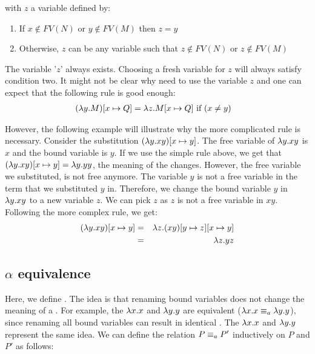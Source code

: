   


with $z$ a variable defined by:
\begin{enumerate}
	\item%
	If $x \notin FV(N)$ or $y \notin FV(M)$ then $z = y$
	\item%
	Otherwise, $z$ can be any variable such that $z \notin FV(N)$ or $z \notin FV(M)$
\end{enumerate}

The variable '$z$' always exists. Choosing a fresh variable for $z$ will always satisfy condition two.
It might not be clear why need to use the variable $z$ and one can expect that the following rule is good enough:
\begin{align*}
	(\lambda {y}.{M}) [{x}\mapsto{Q}] &= \lambda {z}.{M [{x}\mapsto{Q}]} \text{ if } (x \neq y)
\end{align*}

However, the following example will illustrate why the more complicated rule is necessary.
Consider the substitution $(\lambda {y}.{xy})[{x}\mapsto{y}]$. The free variable of \lterm $\lambda {y}.{xy}$ is $x$ and the bound variable is $y$.
If we use the simple rule above, we get that $(\lambda {y}.{xy})[{x}\mapsto{y}] = \lambda {y}.{yy}$, the meaning of the \lterm changes. 
However, the free variable we substituted, is not free anymore. The variable $y$ is not a free variable in the term that we substituted $y$ in.
Therefore, we change the bound variable $y$ in $\lambda {y}.{xy}$ to a new variable $z$. We can pick $z$ as $z$ is not a free variable in $xy$.
Following the more complex rule, we get: 
\begin{eqnarray*}
	(\lambda {y}.{xy})[{x}\mapsto{y}] &=& \lambda {z}.{(xy)[{y}\mapsto{z}][{x}\mapsto{y}]} \\
	&=& \lambda {z}.{yz}
\end{eqnarray*}

\subsection{\texorpdfstring{\boldmath${\alpha}$ equivalence}{Alpha equivalence}}
Here, we define \aeq. The idea is that renaming bound variables does not change the meaning of a \lterm.
For example, the \lterms $\lambda {x}.{x}$ and $\lambda {y}.{y}$ are equivalent ($\lambda {x}.{x} \equiv_a \lambda {y}.{y}$), since renaming all bound variables can result in identical \lterms.
The \lterms $\lambda {x}.{x}$ and $\lambda {y}.{y}$ represent the same idea.
We can define the relation $P \equiv_a P'$ inductively on $P$ and $P'$ as follows:

